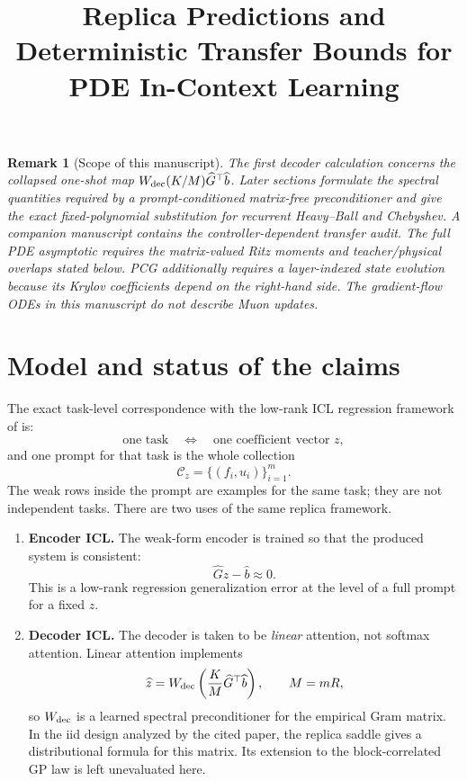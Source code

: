 \documentclass[11pt,a4paper]{article}
\title{Replica Predictions and Deterministic Transfer Bounds for PDE In-Context Learning}
\author{}
\date{}
\newtheorem{remark}{Remark}
\theoremstyle{definition}
\newcommand{\wh}{\widehat}
\newcommand{\calC}{\mathcal C}
\begin{document}
\maketitle

\begin{remark}[Scope of this manuscript]
The first decoder calculation concerns the collapsed one-shot map
\(W_{\rm dec}(K/M)\widehat G^\top\widehat b\).  Later sections formulate the
spectral quantities required by a prompt-conditioned matrix-free
preconditioner and give the exact fixed-polynomial substitution for recurrent
Heavy--Ball and Chebyshev. A companion manuscript contains the
controller-dependent transfer audit.
The full PDE asymptotic requires the matrix-valued Ritz moments and
teacher/physical overlaps stated below.  PCG additionally requires a
layer-indexed state evolution because its Krylov coefficients depend on the
right-hand side.  The gradient-flow ODEs in this manuscript do not describe
Muon updates.
\end{remark}

\section{Model and status of the claims}

The exact task-level correspondence with the low-rank ICL regression framework
of \cite{takanami2026lowrankicl} is:
\[
    \text{one task} \quad\Longleftrightarrow\quad
    \text{one coefficient vector } z,
\]
and one prompt for that task is the whole collection
\[
    \calC_z=\{(f_i,u_i)\}_{i=1}^{m}.
\]
The weak rows inside the prompt are examples for the same task; they are not
independent tasks.  There are two uses of the same replica framework.

\begin{enumerate}
    \item \textbf{Encoder ICL.}  The weak-form encoder is trained so that the
    produced system is consistent:
    \[
        \wh Gz-\wh b\approx 0 .
    \]
    This is a low-rank regression generalization error at the level of a full
    prompt for a fixed $z$.

    \item \textbf{Decoder ICL.}  The decoder is taken to be \emph{linear}
    attention, not softmax attention.  Linear attention implements
    \[
        \wh z
        =
        W_{\rm dec}
        \left(\frac{K}{M}\wh G^\top\wh b\right),
        \qquad M=mR,
    \]
    so $W_{\rm dec}$ is a learned spectral preconditioner for the empirical
    Gram matrix. In the iid design analyzed by the cited paper, the replica
    saddle gives a distributional formula for this matrix. Its extension to
    the block-correlated GP law is left unevaluated here.
\end{enumerate}
\end{document}
